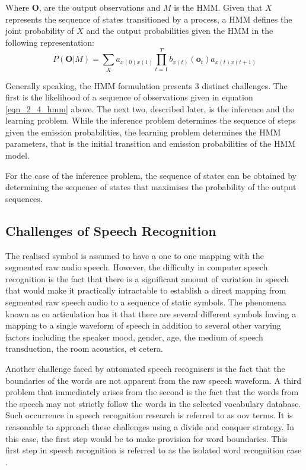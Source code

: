 Where $\mathbf{O}$, are the output observations and $M$ is the HMM.  Given that $X$ represents the sequence of states transitioned by a process, a HMM defines the joint probability of $X$ and the output probabilities given the HMM in the following representation:
\begin{equation}P(\mathbf{O}|M)=\sum_Xa_{x(0)x(1)}\prod_{t=1}^Tb_{x(t)}(\mathbf{o}_t)a_{x(t)x(t+1)}
\label{eqn_2_4_hmm}
\end{equation}

Generally speaking, the HMM formulation presents 3 distinct challenges.  The first is the likelihood of a sequence of observations given in equation \ref{eqn_2_4_hmm} above.  The next two,  described later, is the inference and the learning problem.  While the inference problem determines the sequence of steps given the emission probabilities, the learning problem determines the HMM parameters, that is the initial transition and emission probabilities of the HMM model.

For the case of the inference problem, the sequence of states can be obtained by determining the sequence of states that maximises the probability of the output sequences.

\subsection{Challenges of Speech Recognition}\label{sec_c2_asr_challenges}
The realised symbol is assumed to have a one to one mapping with the segmented raw audio speech. However, the difficulty in computer speech recognition is the fact that there is a significant amount of variation in speech that would make it practically intractable to establish a direct mapping from segmented raw speech audio to a sequence of static symbols. The phenomena known as co articulation has it that there are several different symbols having a mapping to a single waveform of speech in addition to several other varying factors including the speaker mood, gender, age, the medium of speech transduction, the room acoustics, et cetera.

Another challenge faced by automated speech recognisers is the fact that the boundaries of the words are not apparent from the raw speech waveform. A third problem that immediately arises from the second is the fact that the words from the speech may not strictly follow the words in the selected vocabulary database.  Such occurrence in speech recognition research is referred to as \acrfull{oov} terms.  It is reasonable to approach these challenges using a divide and conquer strategy.  In this case, the first step would be to make provision for word boundaries.  This first step in speech recognition is referred to as the isolated word recognition case \citep{young2002htk}.

